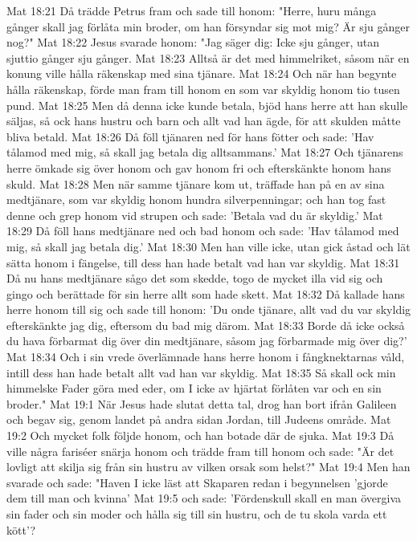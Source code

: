 Mat 18:21  Då trädde Petrus fram och sade till honom: "Herre, huru många gånger skall jag förlåta min broder, om han försyndar sig mot mig? Är sju gånger nog?"
Mat 18:22  Jesus svarade honom: "Jag säger dig: Icke sju gånger, utan sjuttio gånger sju gånger.
Mat 18:23  Alltså är det med himmelriket, såsom när en konung ville hålla räkenskap med sina tjänare.
Mat 18:24  Och när han begynte hålla räkenskap, förde man fram till honom en som var skyldig honom tio tusen pund.
Mat 18:25  Men då denna icke kunde betala, bjöd hans herre att han skulle säljas, så ock hans hustru och barn och allt vad han ägde, för att skulden måtte bliva betald.
Mat 18:26  Då föll tjänaren ned för hans fötter och sade: 'Hav tålamod med mig, så skall jag betala dig alltsammans.'
Mat 18:27  Och tjänarens herre ömkade sig över honom och gav honom fri och efterskänkte honom hans skuld.
Mat 18:28  Men när samme tjänare kom ut, träffade han på en av sina medtjänare, som var skyldig honom hundra silverpenningar; och han tog fast denne och grep honom vid strupen och sade: 'Betala vad du är skyldig.'
Mat 18:29  Då föll hans medtjänare ned och bad honom och sade: 'Hav tålamod med mig, så skall jag betala dig.'
Mat 18:30  Men han ville icke, utan gick åstad och lät sätta honom i fängelse, till dess han hade betalt vad han var skyldig.
Mat 18:31  Då nu hans medtjänare sågo det som skedde, togo de mycket illa vid sig och gingo och berättade för sin herre allt som hade skett.
Mat 18:32  Då kallade hans herre honom till sig och sade till honom: 'Du onde tjänare, allt vad du var skyldig efterskänkte jag dig, eftersom du bad mig därom.
Mat 18:33  Borde då icke också du hava förbarmat dig över din medtjänare, såsom jag förbarmade mig över dig?'
Mat 18:34  Och i sin vrede överlämnade hans herre honom i fångknektarnas våld, intill dess han hade betalt allt vad han var skyldig.
Mat 18:35  Så skall ock min himmelske Fader göra med eder, om I icke av hjärtat förlåten var och en sin broder."
Mat 19:1  När Jesus hade slutat detta tal, drog han bort ifrån Galileen och begav sig, genom landet på andra sidan Jordan, till Judeens område.
Mat 19:2  Och mycket folk följde honom, och han botade där de sjuka.
Mat 19:3  Då ville några fariséer snärja honom och trädde fram till honom och sade: "Är det lovligt att skilja sig från sin hustru av vilken orsak som helst?"
Mat 19:4  Men han svarade och sade: "Haven I icke läst att Skaparen redan i begynnelsen 'gjorde dem till man och kvinna'
Mat 19:5  och sade: 'Fördenskull skall en man övergiva sin fader och sin moder och hålla sig till sin hustru, och de tu skola varda ett kött'?
